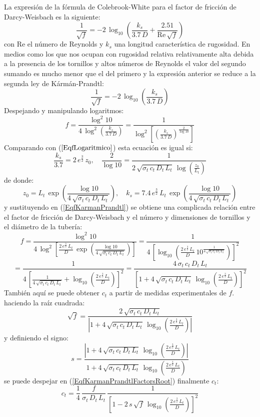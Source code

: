 \documentclass[a4paper]{article}
\newcommand{\EQ}[2]{\begin{equation}#1\label{#2}\end{equation}}
\begin{document}
La expresión de la fórmula de Colebrook-White para el factor de fricción de
Darcy-Weisbach es la siguiente:
\EQ
{
  \frac1{\sqrt{f}}=-2\,\log_{10}\left(\frac{k_s}{3.7\,D}
  +\frac{2.51}{\mathrm{Re}\,\sqrt{f}}\right)
}{EqColebrookWhite}
con Re el número de Reynolds y $k_s$ una longitud característica de rugosidad.
En medios como los que nos ocupan con rugosidad relativa relativamente alta
debida a la presencia de los tornillos y altos números de Reynolds el valor del
segundo sumando es mucho menor que el del primero y la expresión anterior se
reduce a la segunda ley de Kármán-Prandtl:
\EQ{\frac1{\sqrt{f}}=-2\,\log_{10}\left(\frac{k_s}{3.7\,D}\right)}
{EqKarmanPrandtl}
Despejando y manipulando logaritmos:
\EQ
{
  f=\frac{\log^2 10}{4\,\log^2\left(\frac{k_s}{3.7\,D}\right)}
  =\frac1{\log^2\left[\left(\frac{k_s}{3.7\,D}\right)^{\frac2{\log 10}}\right]}
}{EqfKarmanPrandtl}
Comparando con ($\ref{EqfLogaritmico}$) esta ecuación es igual si:
\EQ
{
  \frac{k_s}{3.7}=2\,e^{\frac32}\,z_0,\quad
  \frac{2}{\log 10}
  =\frac1{2\,\sqrt{\sigma_t\,c_t\,D_t\,L_t}\,\log\left(\frac{z_0}{L_t}\right)}
}{EqRugosidadesI}
de donde:
\EQ
{
  z_0=L_t\,\exp\left(\frac{\log 10}{4\,\sqrt{\sigma_t\,c_t\,D_t\,L_t}}\right),
  \quad
  k_s=7.4\,e^{\frac32}\,L_t
  \,\exp\left(\frac{\log 10}{4\,\sqrt{\sigma_t\,c_t\,D_t\,L_t}}\right)
}{EqRugosidadesII}
y sustituyendo en (\ref{EqfKarmanPrandtl}) se obtiene una complicada relación
entre el factor de fricción de Darcy-Weisbach y el número y dimensiones de
tornillos y el diámetro de la tubería:
\[
  f=\frac{\log^2 10}{4\,\log^2\left[\frac{2\,e^{\frac32}\,L_t}{D}
  \,\exp\left(\frac{\log 10}{4\,\sqrt{\sigma_t\,c_t\,D_t\,L_t}}\right)\right]}
  =\frac1{4\,\left[\log_{10}\left(\frac{2\,e^{\frac32}\,L_t}{D}
  \,10^{\frac1{4\,\sqrt{\sigma_t\,c_t\,D_t\,L_t}}}\right)\right]^2}
\]
\EQ
{
  =\frac1{4\,\left[\frac1{4\,\sqrt{\sigma_t\,c_t\,D_t\,L_t}}
  +\log_{10}\left(\frac{2\,e^{\frac32}\,L_t}{D}\right)\right]^2}
  =\frac{4\,\sigma_t\,c_t\,D_t\,L_t}{\left[1+4\,\sqrt{\sigma_t\,c_t\,D_t\,L_t}
  \,\log_{10}\left(\frac{2\,e^{\frac32}\,L_t}{D}\right)\right]^2}
}{EqfKarmanPrandtlFactors}
También aquí se puede obtener $c_t$ a partir de medidas experimentales de $f$.
haciendo la raíz cuadrada:
\EQ
{
  \sqrt{f}=\frac{2\,\sqrt{\sigma_t\,c_t\,D_t\,L_t}}
  {\left|1+4\,\sqrt{\sigma_t\,c_t\,D_t\,L_t}
  \,\log_{10}\left(\frac{2\,e^{\frac32}\,L_t}{D}\right)\right|}
}{EqfKarmanPrandtlFactorsRoot}
y definiendo el signo:
\EQ
{
  s=\frac{\left|1+4\,\sqrt{\sigma_t\,c_t\,D_t\,L_t}
  \,\log_{10}\left(\frac{2\,e^{\frac32}\,L_t}{D}\right)\right|}
  {1+4\,\sqrt{\sigma_t\,c_t\,D_t\,L_t}
  \,\log_{10}\left(\frac{2\,e^{\frac32}\,L_t}{D}\right)}
}{EqfKarmanPrandtlFactorsSign}
se puede despejar en (\ref{EqfKarmanPrandtlFactorsRoot}) finalmente $c_t$:
\EQ
{
  c_t=\frac14\,\frac{f}{\sigma_t\,D_t\,L_t}\,\frac1{\left[
  1-2\,s\,\sqrt{f}\,\log_{10}\left(\frac{2\,e^{\frac32}\,L_t}{D}\right)\right]^2}
}{EqfKarmanPrandtlct}
\end{document}
